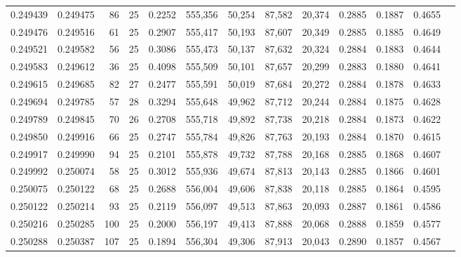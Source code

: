 \begin{tabular}{rrrrrrrrrrrrr}
0.249439 & 0.249475 &  86 &  25 &                                     0.2252 & 555,356 &  50,254 &  87,582 &  20,374 & 0.2885 & 0.1887 & 0.4655 \\
0.249476 & 0.249516 &  61 &  25 &                                     0.2907 & 555,417 &  50,193 &  87,607 &  20,349 & 0.2885 & 0.1885 & 0.4649 \\
0.249521 & 0.249582 &  56 &  25 &                                     0.3086 & 555,473 &  50,137 &  87,632 &  20,324 & 0.2884 & 0.1883 & 0.4644 \\
0.249583 & 0.249612 &  36 &  25 &                                     0.4098 & 555,509 &  50,101 &  87,657 &  20,299 & 0.2883 & 0.1880 & 0.4641 \\
0.249615 & 0.249685 &  82 &  27 &                                     0.2477 & 555,591 &  50,019 &  87,684 &  20,272 & 0.2884 & 0.1878 & 0.4633 \\
0.249694 & 0.249785 &  57 &  28 &                                     0.3294 & 555,648 &  49,962 &  87,712 &  20,244 & 0.2884 & 0.1875 & 0.4628 \\
0.249789 & 0.249845 &  70 &  26 &                                     0.2708 & 555,718 &  49,892 &  87,738 &  20,218 & 0.2884 & 0.1873 & 0.4622 \\
0.249850 & 0.249916 &  66 &  25 &                                     0.2747 & 555,784 &  49,826 &  87,763 &  20,193 & 0.2884 & 0.1870 & 0.4615 \\
0.249917 & 0.249990 &  94 &  25 &                                     0.2101 & 555,878 &  49,732 &  87,788 &  20,168 & 0.2885 & 0.1868 & 0.4607 \\
0.249992 & 0.250074 &  58 &  25 &                                     0.3012 & 555,936 &  49,674 &  87,813 &  20,143 & 0.2885 & 0.1866 & 0.4601 \\
0.250075 & 0.250122 &  68 &  25 &                                     0.2688 & 556,004 &  49,606 &  87,838 &  20,118 & 0.2885 & 0.1864 & 0.4595 \\
0.250122 & 0.250214 &  93 &  25 &                                     0.2119 & 556,097 &  49,513 &  87,863 &  20,093 & 0.2887 & 0.1861 & 0.4586 \\
0.250216 & 0.250285 & 100 &  25 &                                     0.2000 & 556,197 &  49,413 &  87,888 &  20,068 & 0.2888 & 0.1859 & 0.4577 \\
0.250288 & 0.250387 & 107 &  25 &                                     0.1894 & 556,304 &  49,306 &  87,913 &  20,043 & 0.2890 & 0.1857 & 0.4567 \\

\end{tabular}
